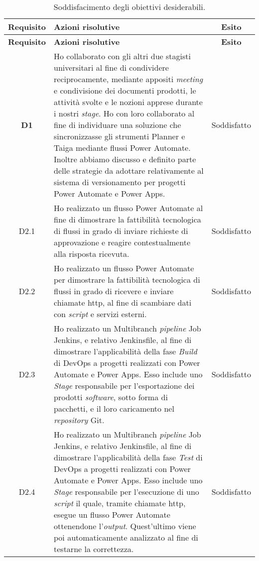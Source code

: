 \begin{longtable}{|c|p{8cm}|c|}
    \caption{Soddisfacimento degli obiettivi desiderabili.}
    \label{tab:soddObbDesiderabili}\\
    \hline \textbf{Requisito} & \textbf{Azioni risolutive} & \textbf{Esito}\\ \endfirsthead
    \hline \textbf{Requisito} & \textbf{Azioni risolutive} & \textbf{Esito}\\ \endhead
    \endfoot
    \hline \endlastfoot
    \hline \textbf{D1}  & Ho collaborato con gli altri due stagisti universitari al fine di condividere reciprocamente, mediante appositi \emph{meeting} e condivisione dei documenti prodotti, le attività svolte e le nozioni apprese durante i nostri \emph{stage}. Ho con loro collaborato al fine di individuare una soluzione che sincronizzasse gli strumenti Planner e Taiga mediante flussi Power Automate. Inoltre abbiamo discusso e definito parte delle strategie da adottare relativamente al sistema di versionamento per progetti Power Automate e Power Apps. & Soddisfatto\\
    \hline D2.1  & Ho realizzato un flusso Power Automate al fine di dimostrare la fattibilità tecnologica di flussi in grado di inviare richieste di approvazione e reagire contestualmente alla risposta ricevuta. & Soddisfatto\\
    \hline D2.2  & Ho realizzato un flusso Power Automate per dimostrare la fattibilità tecnologica di flussi in grado di ricevere e inviare chiamate \gls{http}, al fine di scambiare dati con \emph{script} e servizi esterni. & Soddisfatto\\
    \hline D2.3  & Ho realizzato un Multibranch \emph{pipeline} Job Jenkins, e relativo Jenkinsfile, al fine di dimostrare l'applicabilità della fase \emph{Build} di \gls{DevOps} a progetti realizzati con Power Automate e Power Apps. Esso include uno \emph{Stage} responsabile per l'esportazione dei prodotti \emph{software}, sotto forma di pacchetti, e il loro caricamento nel \emph{repository} Git. & Soddisfatto\\
    \hline D2.4  & Ho realizzato un Multibranch \emph{pipeline} Job Jenkins, e relativo Jenkinsfile, al fine di dimostrare l'applicabilità della fase \emph{Test} di \gls{DevOps} a progetti realizzati con Power Automate e Power Apps. Esso include uno \emph{Stage} responsabile per l'esecuzione di uno \emph{script} il quale, tramite chiamate \gls{http}, esegue un flusso Power Automate ottenendone l'\emph{output}. Quest'ultimo viene poi automaticamente analizzato al fine di testarne la correttezza. & Soddisfatto\\

\end{longtable}
